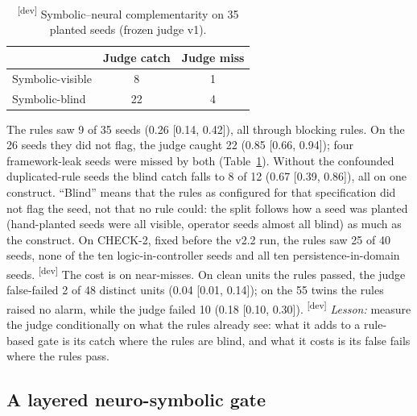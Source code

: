 \documentclass[10pt,a4paper]{article}
\newcommand{\devset}{\textsuperscript{\textsf{\tiny[dev]}}}
\begin{document}
\begin{table}[t]
\centering\small
\caption{\devset{} Symbolic--neural complementarity on 35 planted seeds (frozen judge v1).}
\label{tab:complement}
\begin{tabular}{lcc}
\toprule
 & Judge catch & Judge miss \\
\midrule
Symbolic-visible & 8 & 1 \\
Symbolic-blind   & 22 & 4 \\
\bottomrule
\end{tabular}
\end{table}

The rules saw 9 of 35 seeds (0.26 [0.14, 0.42]), all through blocking rules. On the 26 seeds they did not flag, the
judge caught 22 (0.85 [0.66, 0.94]); four framework-leak seeds were missed by both (Table~\ref{tab:complement}).
Without the confounded duplicated-rule seeds the blind catch falls to 8 of 12 (0.67 [0.39, 0.86]), all on one
construct. ``Blind'' means that the rules as configured for that specification did not flag the seed, not that no rule
could: the split follows how a seed was planted (hand-planted seeds were all visible, operator seeds almost all
blind) as much as the construct. On CHECK-2, fixed before the v2.2 run, the rules saw 25 of 40 seeds, none of the ten
logic-in-controller seeds and all ten persistence-in-domain seeds. \devset{}
The cost is on near-misses. On clean units the rules passed, the judge false-failed 2 of 48 distinct units
(0.04 [0.01, 0.14]); on the 55 twins the rules raised no alarm, while the judge failed 10 (0.18 [0.10, 0.30]).
\devset{}
\emph{Lesson:} measure the judge conditionally on what the rules already see: what it adds to a rule-based gate is
its catch where the rules are blind, and what it costs is its false fails where the rules pass.

\subsection{A layered neuro-symbolic gate}\label{sec:layered}
\end{document}

